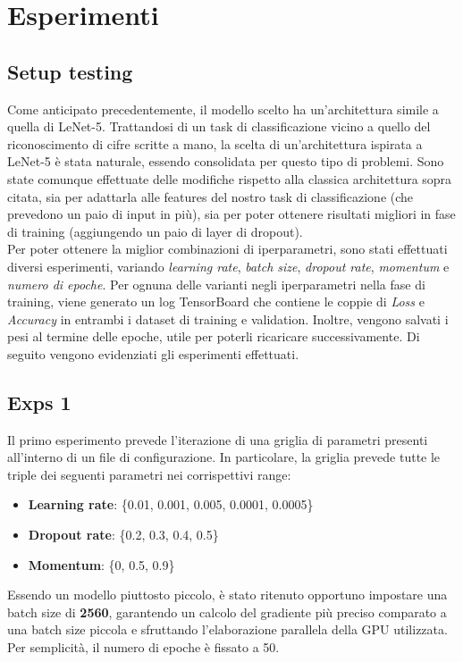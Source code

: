 \chapter{Esperimenti}
\section*{Setup testing}
Come anticipato precedentemente, il modello scelto ha un'architettura simile a quella di LeNet-5. Trattandosi di un task di classificazione vicino a quello del riconoscimento di cifre scritte a mano, la scelta di un'architettura ispirata a LeNet-5 è stata naturale, essendo consolidata per questo tipo di problemi.
Sono state comunque effettuate delle modifiche rispetto alla classica architettura sopra citata, sia per adattarla alle features del nostro task di classificazione (che prevedono un paio di input in più), sia per poter ottenere risultati migliori in fase di training (aggiungendo un paio di layer di dropout).
\\
Per poter ottenere la miglior combinazioni di iperparametri, sono stati effettuati diversi esperimenti, variando \emph{learning rate}, \emph{batch size}, \emph{dropout rate}, \emph{momentum} e \emph{numero di epoche}.
Per ognuna delle varianti negli iperparametri nella fase di training, viene generato un log TensorBoard che contiene le coppie di \emph{Loss} e \emph{Accuracy} in entrambi i dataset di training e validation. Inoltre, vengono salvati i pesi al termine delle epoche, utile per poterli ricaricare successivamente.
Di seguito vengono evidenziati gli esperimenti effettuati.

\section{Exps 1}
Il primo esperimento prevede l'iterazione di una griglia di parametri presenti all'interno di un file di configurazione. In particolare, la griglia prevede tutte le triple dei seguenti parametri nei corrispettivi range:
\begin{itemize}
    \item \textbf{Learning rate}: \{0.01, 0.001, 0.005, 0.0001, 0.0005\}
    \item \textbf{Dropout rate}: \{0.2, 0.3, 0.4, 0.5\}
    \item \textbf{Momentum}: \{0, 0.5, 0.9\}
\end{itemize}

Essendo un modello piuttosto piccolo, è stato ritenuto opportuno impostare una batch size di \textbf{2560}, garantendo un calcolo del gradiente più preciso comparato a una batch size piccola e sfruttando l'elaborazione parallela della GPU utilizzata. Per semplicità, il numero di epoche è fissato a 50.

